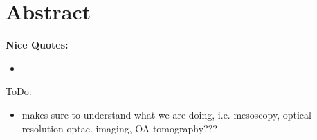 \section*{Abstract}

\textbf{Nice Quotes:
}\begin{itemize}
	\item 
\end{itemize}

ToDo:
\begin{itemize}
	\item makes sure to understand what we are doing, i.e. mesoscopy, optical resolution optac. imaging, OA tomography???
\end{itemize}